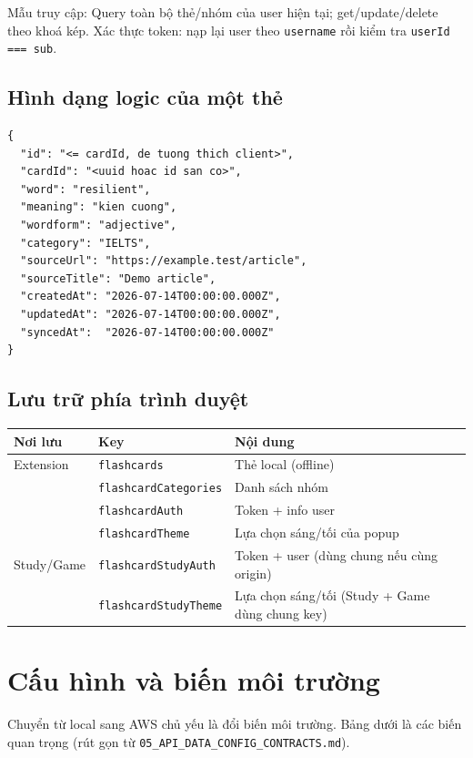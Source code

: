 \documentclass[11pt,a4paper]{article}
\newcommand{\code}[1]{\texttt{#1}}
\begin{document}
\noindent Mẫu truy cập: Query toàn bộ thẻ/nhóm của user hiện tại; get/update/delete theo khoá kép.
Xác thực token: nạp lại user theo \code{username} rồi kiểm tra \code{userId === sub}.

\subsection{Hình dạng logic của một thẻ}
\begin{lstlisting}
{
  "id": "<= cardId, de tuong thich client>",
  "cardId": "<uuid hoac id san co>",
  "word": "resilient",
  "meaning": "kien cuong",
  "wordform": "adjective",
  "category": "IELTS",
  "sourceUrl": "https://example.test/article",
  "sourceTitle": "Demo article",
  "createdAt": "2026-07-14T00:00:00.000Z",
  "updatedAt": "2026-07-14T00:00:00.000Z",
  "syncedAt":  "2026-07-14T00:00:00.000Z"
}
\end{lstlisting}

\subsection{Lưu trữ phía trình duyệt}
\begin{longtable}{@{}p{3.2cm} p{5.0cm} p{6.8cm}@{}}
\toprule
\textbf{Nơi lưu} & \textbf{Key} & \textbf{Nội dung} \\
\midrule
\endhead
Extension & \code{flashcards} & Thẻ local (offline) \\
          & \code{flashcardCategories} & Danh sách nhóm \\
          & \code{flashcardAuth} & Token + info user \\
          & \code{flashcardTheme} & Lựa chọn sáng/tối của popup \\
\addlinespace
Study/Game & \code{flashcardStudyAuth} & Token + user (dùng chung nếu cùng origin) \\
           & \code{flashcardStudyTheme} & Lựa chọn sáng/tối (Study + Game dùng chung key) \\
\bottomrule
\end{longtable}

\section{Cấu hình và biến môi trường}

Chuyển từ local sang AWS chủ yếu là đổi biến môi trường. Bảng dưới là các biến quan trọng
(rút gọn từ \code{05\_API\_DATA\_CONFIG\_CONTRACTS.md}).
\end{document}
